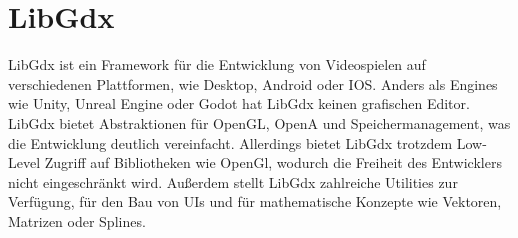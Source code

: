
\section{LibGdx}\label{sec:LibGdx}

\renewcommand{\kapitelautor}{Autor: Marvin Kurka}

LibGdx ist ein Framework für die Entwicklung von Videospielen auf verschiedenen Plattformen, wie \zB Desktop, Android
oder IOS.
Anders als Engines wie \zB Unity, Unreal Engine oder Godot hat LibGdx keinen grafischen Editor.
LibGdx bietet Abstraktionen für OpenGL, OpenA und Speichermanagement, was die Entwicklung deutlich vereinfacht.
Allerdings bietet LibGdx trotzdem Low-Level Zugriff auf Bibliotheken wie OpenGl, wodurch die Freiheit des Entwicklers
nicht eingeschränkt wird.
Außerdem stellt LibGdx zahlreiche Utilities zur Verfügung, \zB für den Bau von UIs und für mathematische Konzepte wie
Vektoren, Matrizen oder Splines.\cite{libgdxFeatures}





